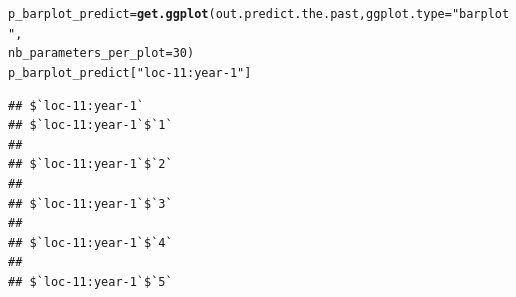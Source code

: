 \documentclass{article}\usepackage[]{graphicx}\usepackage[]{color}
\makeatletter
\newcommand{\hlnum}[1]{\textcolor[rgb]{0.686,0.059,0.569}{#1}}%
\newcommand{\hlstr}[1]{\textcolor[rgb]{0.192,0.494,0.8}{#1}}%
\newcommand{\hlstd}[1]{\textcolor[rgb]{0.345,0.345,0.345}{#1}}%
\newcommand{\hlkwb}[1]{\textcolor[rgb]{0.69,0.353,0.396}{#1}}%
\newcommand{\hlkwc}[1]{\textcolor[rgb]{0.333,0.667,0.333}{#1}}%
\newcommand{\hlkwd}[1]{\textcolor[rgb]{0.737,0.353,0.396}{\textbf{#1}}}%
\newenvironment{kframe}{%
 \def\at@end@of@kframe{}%
 \ifinner\ifhmode%
  \def\at@end@of@kframe{\end{minipage}}%
  \begin{minipage}{\columnwidth}%
 \fi\fi%
 \def\FrameCommand##1{\hskip\@totalleftmargin \hskip-\fboxsep
 \colorbox{shadecolor}{##1}\hskip-\fboxsep
     \hskip-\linewidth \hskip-\@totalleftmargin \hskip\columnwidth}%
 \MakeFramed {\advance\hsize-\width
   \@totalleftmargin\z@ \linewidth\hsize
   \@setminipage}}%
 {\par\unskip\endMakeFramed%
 \at@end@of@kframe}
\newenvironment{knitrout}{}{} %
\makeatother
\begin{document}
\begin{knitrout}
\color{fgcolor}\begin{kframe}
\begin{alltt}
\hlstd{p_barplot_predict} \hlkwb{=} \hlkwd{get.ggplot}\hlstd{(out.predict.the.past,} \hlkwc{ggplot.type} \hlstd{=} \hlstr{"barplot"}\hlstd{,}
                               \hlkwc{nb_parameters_per_plot} \hlstd{=} \hlnum{30}\hlstd{)}
\hlstd{p_barplot_predict[}\hlstr{"loc-11:year-1"}\hlstd{]}
\end{alltt}
\begin{verbatim}
## $`loc-11:year-1`
## $`loc-11:year-1`$`1`
## 
## $`loc-11:year-1`$`2`
## 
## $`loc-11:year-1`$`3`
## 
## $`loc-11:year-1`$`4`
## 
## $`loc-11:year-1`$`5`
\end{verbatim}
\end{kframe}




\end{knitrout}
\end{document}
